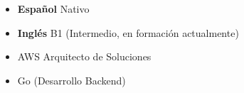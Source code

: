 %
%
%

\twocolumnsection
{
\vspace{1em}
\begin{itemize}
	\item \textbf{Español} Nativo
	\item \textbf{Inglés} B1 (Intermedio, en formación actualmente)
\end{itemize}
}
{
\vspace{1em}
\begin{itemize}
	\item AWS Arquitecto de Soluciones
	\item Go (Desarrollo Backend)
\end{itemize}
}
